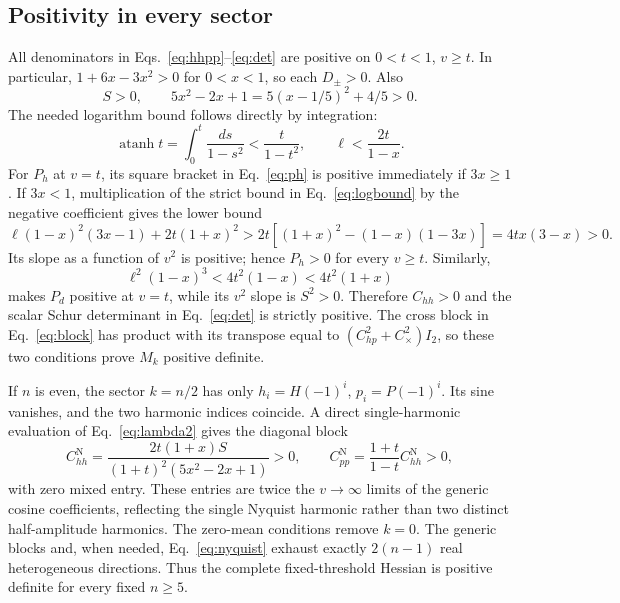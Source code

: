 \documentclass[aps,pre,onecolumn,11pt,notitlepage,nofootinbib]{revtex4-2}
\newcommand{\atanh}{\operatorname{atanh}}
\begin{document}
\subsection{Positivity in every sector}
All denominators in Eqs.~\eqref{eq:hhpp}--\eqref{eq:det} are positive on $0<t<1$, $v\geq t$. In particular, $1+6x-3x^2>0$ for $0<x<1$, so each $D_\pm>0$. Also
\begin{equation}
 S>0,\qquad 5x^2-2x+1=5(x-1/5)^2+4/5>0.
\end{equation}
The needed logarithm bound follows directly by integration:
\begin{equation}
 \atanh t=\int_0^t\frac{ds}{1-s^2}<\frac{t}{1-t^2},\qquad
 \ell<\frac{2t}{1-x}.
 \label{eq:logbound}
\end{equation}
For $P_h$ at $v=t$, its square bracket in Eq.~\eqref{eq:ph} is positive immediately if $3x\geq1$. If $3x<1$, multiplication of the strict bound in Eq.~\eqref{eq:logbound} by the negative coefficient gives the lower bound
\begin{equation}
 \ell(1-x)^2(3x-1)+2t(1+x)^2
 >2t\left[(1+x)^2-(1-x)(1-3x)\right]
 =4tx(3-x)>0.
\end{equation}
Its slope as a function of $v^2$ is positive; hence $P_h>0$ for every $v\geq t$. Similarly,
\begin{equation}
 \ell^2(1-x)^3<4t^2(1-x)<4t^2(1+x)
\end{equation}
makes $P_d$ positive at $v=t$, while its $v^2$ slope is $S^2>0$. Therefore $C_{hh}>0$ and the scalar Schur determinant in Eq.~\eqref{eq:det} is strictly positive. The cross block in Eq.~\eqref{eq:block} has product with its transpose equal to $(C_{hp}^2+C_{\times}^2)I_2$, so these two conditions prove $M_k$ positive definite.

If $n$ is even, the sector $k=n/2$ has only $h_i=H(-1)^i$, $p_i=P(-1)^i$. Its sine vanishes, and the two harmonic indices coincide. A direct single-harmonic evaluation of Eq.~\eqref{eq:lambda2} gives the diagonal block
\begin{equation}
 C_{hh}^{\mathrm N}=\frac{2t(1+x)S}{(1+t)^2(5x^2-2x+1)}>0,\qquad
 C_{pp}^{\mathrm N}=\frac{1+t}{1-t}C_{hh}^{\mathrm N}>0,
 \label{eq:nyquist}
\end{equation}
with zero mixed entry. These entries are twice the $v\to\infty$ limits of the generic cosine coefficients, reflecting the single Nyquist harmonic rather than two distinct half-amplitude harmonics. The zero-mean conditions remove $k=0$. The generic blocks and, when needed, Eq.~\eqref{eq:nyquist} exhaust exactly $2(n-1)$ real heterogeneous directions. Thus the complete fixed-threshold Hessian is positive definite for every fixed $n\geq5$.
\end{document}

